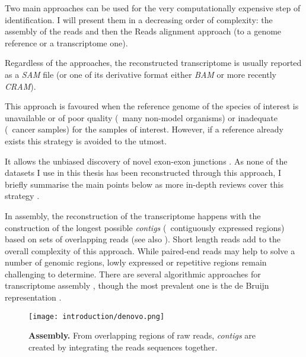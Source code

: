 Two main approaches can be used for the very computationally expensive step of
identification. I will present them in a decreasing order of complexity:
the  assembly of the reads and then the Reads alignment approach
(to a genome reference or a transcriptome one).

Regardless of the approaches, the reconstructed transcriptome is usually reported
as a \emph{\gls{SAM}} file  (or one of its derivative format
either \emph{\gls{BAM}} or more recently \emph{CRAM}).

\begin{comment}
\begin{figure}
    \texttt{[image: introduction/MappingStrategies3.pdf]}\centering
    \caption[Overview of main reconstruction strategies for
    \Rnaseq\ transcriptome]{\label{fig:OverviewRnaseqMapping}\textbf{Overview of main
    reconstruction strategies for a \Rnaseq\ transcriptome}}
\end{figure}
\end{comment}

This approach is favoured when the reference genome of the species of interest
is unavailable or of poor quality
(\eg\ many non-model organisms) or inadequate (\eg\ cancer samples)
for the samples of interest. However, if a reference already exists this strategy
is avoided to the utmost.

It allows the unbiased discovery of novel
exon-exon junctions . As none of the datasets I use in this
thesis has been reconstructed through this approach, I briefly summarise
the main points below as more in-depth reviews cover this strategy
.

In  assembly, the reconstruction of the transcriptome happens
with the construction of the longest possible \emph{contigs} (\ie\ contiguously
expressed regions) based on sets of overlapping reads (see also
). Short length reads add
to the overall complexity of this approach. While paired-end reads may help to
solve a number of genomic regions, lowly expressed or repetitive regions remain
challenging to determine. There are several algorithmic approaches for  transcriptome assembly ,
though the most prevalent one is the de Bruijn representation .

\begin{figure}
    \texttt{[image: introduction/denovo.png]}\centering
    \caption[\textit{de novo} Assembly]{\label{fig:denovo}\textbf{
    Assembly.} From overlapping regions of raw reads, \emph{contigs} are
    created by integrating the reads sequences together.}
\end{figure}


